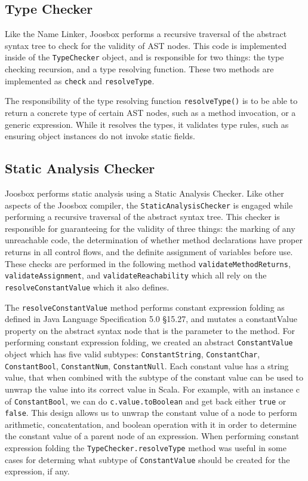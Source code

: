 \documentclass[letterpaper]{article}
\begin{document}
  \subsection{Type Checker}

  Like the Name Linker, Joosbox performs a recursive traversal of the abstract
  syntax tree to check for the validity of AST nodes. This code is implemented
  inside of the {\tt TypeChecker} object, and is responsible for two things: the
  type checking recursion, and a type resolving function. These two methods are
  implemented as {\tt check} and {\tt resolveType}.

  The responsibility of the type resolving function {\tt resolveType()} is to be
  able to return a concrete type of certain AST nodes, such as a method
  invocation, or a generic expression. While it resolves the types, it validates
  type rules, such as ensuring object instances do not invoke static fields.


  \subsection{Static Analysis Checker}

  Joosbox performs static analysis using a Static Analysis Checker. Like other
  aspects of the Joosbox compiler, the {\tt StaticAnalysisChecker} is engaged 
  while performing a recursive traversal of the abstract syntax tree. This
  checker is responsible for guaranteeing for the validity of three things: the
  marking of any unreachable code, the determination of whether method
  declarations have proper returns in all control flows, and the definite
  assignment of variables before use. These checks are performed in the
  following method {\tt validateMethodReturns},
  {\tt validateAssignment}, and {\tt validateReachability}
  which all rely on the {\tt resolveConstantValue} which it also defines.

  The {\tt resolveConstantValue} method performs constant expression folding as
  defined in  Java Language Specification 5.0 \S 15.27, and mutates a
  constantValue property on the abstract syntax node that is the parameter to
  the method. For performing constant expression folding, we created an abstract
  {\tt ConstantValue} object which has five valid subtypes: {\tt ConstantString},
  {\tt ConstantChar}, {\tt ConstantBool}, {\tt ConstantNum}, {\tt ConstantNull}.
  Each constant value has a string value, that when combined with the subtype of
  the constant value can be used to unwrap the value into its correct value in
  Scala. For example, with an instance c of {\tt ConstantBool}, we can do
  {\tt c.value.toBoolean} and get back either {\tt true} or {\tt false}. This
  design allows us to unwrap the constant value of a node to perform arithmetic,
  concatentation, and boolean operation with it in order to determine the
  constant value of a parent node of an expression. When performing constant
  expression folding the {\tt TypeChecker.resolveType} method was useful in some
  cases for determing what subtype of {\tt ConstantValue} should be created for
  the expression, if any.
\end{document}
